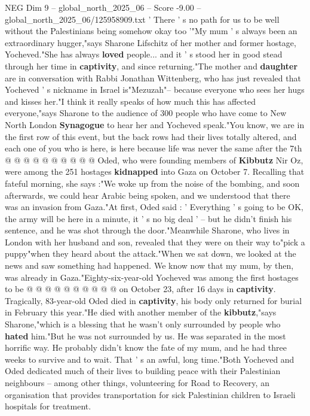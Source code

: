 \begin{textsample}{NEG Dim 9 – global\_north\_2025\_06 – Score -9.00 – global\_north\_2025\_06/125958909.txt}  \label{ex:f9_neg_093}
' There ' s no path for us to be well without the Palestinians being somehow okay too '"My mum ' s always been an extraordinary hugger,"says Sharone Lifschitz of her mother and former hostage, Yocheved."She has always \textbf{loved} people... and it ' s stood her in good stead through her time in \textbf{captivity}, and since returning."The mother and \textbf{daughter} are in conversation with Rabbi Jonathan Wittenberg, who has just revealed that Yocheved ' s nickname in Israel is"Mezuzah"-- because everyone who sees her hugs and kisses her."I think it really speaks of how much this has affected everyone,"says Sharone to the audience of 300 people who have come to New North London \textbf{Synagogue} to hear her and Yocheved speak."You know, we are in the first row of this event, but the back rows had their lives totally altered, and each one of you who is here, is here because life was never the same after the 7th @ @ @ @ @ @ @ @ @ @ Oded, who were founding members of \textbf{Kibbutz} Nir Oz, were among the 251 hostages \textbf{kidnapped} into Gaza on October 7.
Recalling that fateful morning, she says :"We woke up from the noise of the bombing, and soon afterwards, we could hear Arabic being spoken, and we understood that there was an invasion from Gaza."At first, Oded said : ' Everything ' s going to be OK, the army will be here in a minute, it ' s no big deal ' -- but he didn't finish his sentence, and he was shot through the door."Meanwhile Sharone, who lives in London with her husband and son, revealed that they were on their way to"pick a puppy"when they heard about the attack."When we sat down, we looked at the news and saw something had happened.
We know now that my mum, by then, was already in Gaza."Eighty-six-year-old Yocheved was among the first hostages to be @ @ @ @ @ @ @ @ @ @ on October 23, after 16 days in \textbf{captivity}.
Tragically, 83-year-old Oded died in \textbf{captivity}, his body only returned for burial in February this year."He died with another member of the \textbf{kibbutz},"says Sharone,"which is a blessing that he wasn't only surrounded by people who \textbf{hated} him."But he was not surrounded by us.
He was separated in the most horrific way.
He probably didn't know the fate of my mum, and he had three weeks to survive and to wait.
That ' s an awful, long time."Both Yocheved and Oded dedicated much of their lives to building peace with their Palestinian neighbours -- among other things, volunteering for Road to Recovery, an organisation that provides transportation for sick Palestinian children to Israeli hospitals for treatment.

\end{textsample}
